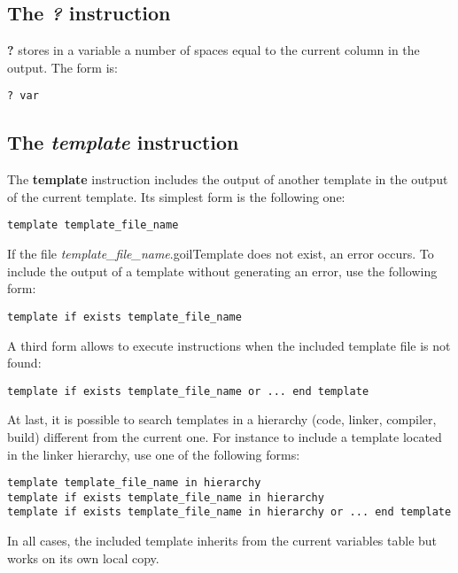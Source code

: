 \subsection{The {\em ?} instruction}

{\bf ?} stores in a variable a number of spaces equal to the current column in the output. The form is:

\begin{lstlisting}
? var
\end{lstlisting}

\subsection{The {\em template} instruction}

The {\bf template} instruction includes the output of another template in the output of the current template. Its simplest form is the following one:

\begin{lstlisting}
template template_file_name
\end{lstlisting}

If the file {\em template\_file\_name}.goilTemplate does not exist, an error occurs. To include the output of a template without generating an error, use the following form:

\begin{lstlisting}
template if exists template_file_name
\end{lstlisting}

A third form allows to execute instructions when the included template file is not found:

\begin{lstlisting}
template if exists template_file_name or ... end template
\end{lstlisting}

At last, it is possible to search templates in a hierarchy (code, linker, compiler, build) different from the current one. For instance to include a template located in the linker hierarchy, use one of the following forms:

\begin{lstlisting}
template template_file_name in hierarchy
template if exists template_file_name in hierarchy
template if exists template_file_name in hierarchy or ... end template
\end{lstlisting}


In all cases, the included template inherits from the current variables table but works on its own local copy.

